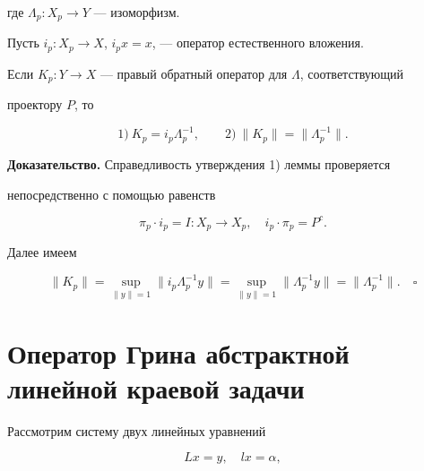 где $\Lambda_p:X_p\to Y$ --- изоморфизм. 


 


Пусть $i_p:X_p\to X$, $i_p x=x$, --- оператор естественного вложения. 


 


\begin{lem} 


Если $K_p:Y\to X$ --- правый обратный оператор для $\Lambda$, соответствующий 


проектору $P$, то 


$$ 


1) \ K_p=i_p\Lambda^{-1}_p,\qquad 


2) \ \|K_p\|=\|\Lambda^{-1}_p\|. 


$$ 


\end{lem} 


 


{\bf Доказательство.} Справедливость утверждения 1) леммы проверяется 


непосредственно с помощью равенств


$$ 


\pi_p\cdot i_p=I:X_p\to X_p,\quad 


i_p\cdot \pi_p=P^c. 


$$ 


Далее имеем 


$$ 


\|K_p\|=\sup_{\|y\|=1}\|i_p\Lambda^{-1}_p y\|= 


\sup_{\|y\|=1}\|\Lambda^{-1}_p y\|=\|\Lambda^{-1}_p\|. 


\quad\square 


$$ 


 


\section{Оператор Грина абстрактной линейной краевой задачи} 


 


Рассмотрим систему двух линейных уравнений 


\begin{equation} 


L x=y, \quad l x=\alpha, 


\end{equation} 


